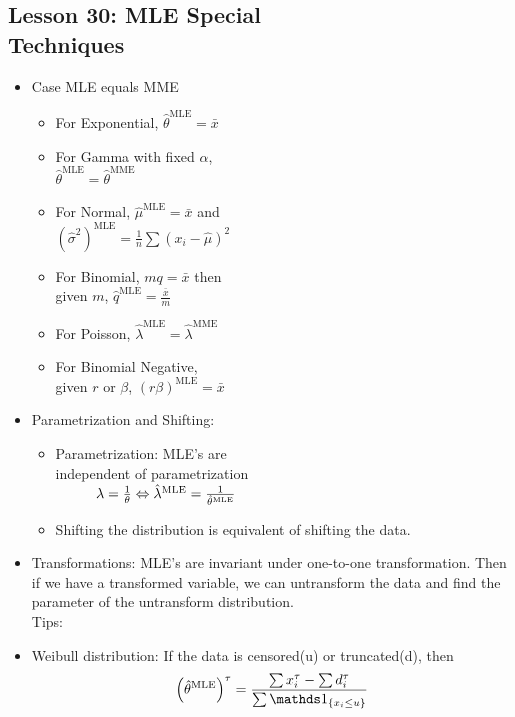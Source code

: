 \documentclass[10pt, french]{article}
\begin{document}
\begin{multicols*}{3}
\section*{Lesson 30: MLE Special \\ Techniques}
\begin{itemize}[align=left,leftmargin=*]
    \item Case MLE equals MME
    \begin{itemize}
        \item For Exponential, $\hat{\theta}^{\mathrm{MLE}}=\bar{x}$
        \item For Gamma with fixed $\alpha$, \\ $\hat{\theta}^{\mathrm{MLE}} = \hat{\theta}^{\mathrm{MME}}$
        \item For Normal, $\hat{\mu}^{\mathrm{MLE}}=\bar{x}$ and \\ $(\hat{\sigma}^2)^{\mathrm{MLE}} = \frac{1}{n} \sum (x_i-\hat{\mu})^2$
        \item For Binomial, $mq=\bar{x}$ then \\ given $m$, $\hat{q}^{\mathrm{MLE}}=\frac{\bar{x}}{m}$
        \item For Poisson, $\hat{\lambda}^{\mathrm{MLE}}=\hat{\lambda}^{\mathrm{MME}}$
        \item For Binomial Negative, \\ given  $r$ or $\beta$, $(r \beta)^{\mathrm{MLE}} = \bar{x}$
    \end{itemize}
    \item Parametrization and Shifting:
    \begin{itemize}
        \item Parametrization: MLE's are \\ independent of parametrization \\ $\hspace*{1cm} \lambda = \frac{1}{\theta} \Leftrightarrow \hat{\lambda}^{\mathrm{MLE}} = \frac{1}{\hat{\theta}^{\mathrm{MLE}}}$
        \item Shifting the distribution is equivalent of shifting the data.
    \end{itemize}
    \item Transformations: MLE's are invariant under one-to-one transformation. Then if we have a transformed variable, we can untransform the data and find the parameter of the untransform distribution. \\
    Tips: {\color{AppendixColor} }
    \item Weibull distribution: If the data is censored(u) or truncated(d), then \[ \left(\hat{\theta}^{\mathrm{MLE}}\right)^\tau=\frac{\sum x_i^\tau - \sum d_i^\tau}{\sum \indic{x_i \leq u}}\]

\end{itemize}
\end{multicols*}
\end{document}
